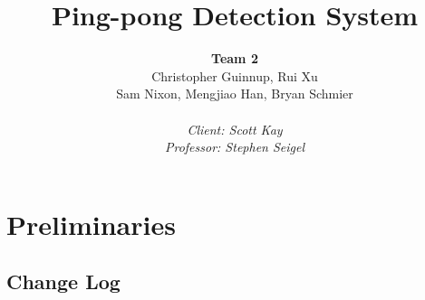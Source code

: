 \documentclass[11pt]{report}
\title{Ping-pong Detection System}
\author{\textbf{Team 2}\\ 
  Christopher Guinnup, Rui Xu\\
  Sam Nixon, Mengjiao Han, Bryan Schmier\\
\\
  \emph{Client: Scott Kay}\\
  \emph{Professor: Stephen Seigel}
}
\begin{document}
\maketitle
\tableofcontents


\chapter{Preliminaries}

\section{Change Log}
\begin{center}

\begin{tabular}{|c|c|c|c|}\hline


\end{tabular}
\end{center}
\end{document}
